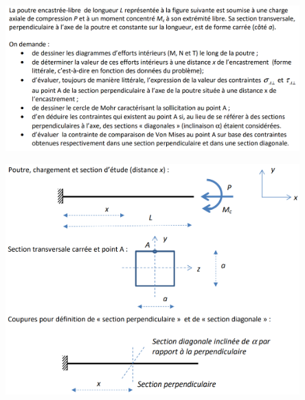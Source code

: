 \documentclass[a4paper]{article}
\begin{document}
\begin{center}
\includegraphics[width=0.85\textwidth]{images/enoncepoutre01.PNG}
\end{center}
\begin{center}
\includegraphics[width=0.85\textwidth]{images/enoncepoutre02.PNG}
\end{center}
\end{document}
